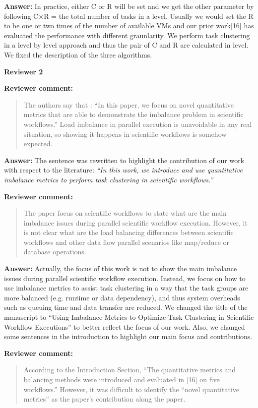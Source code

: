 \documentclass{letter}
\newenvironment{review}%
{\textbf{Reviewer comment:}\begin{quote}}%
{\end{quote}}%
\newcommand{\answer}[1]{%
      \textbf{Answer:} #1}
\newcommand{\revised}[1]{\emph{#1}\color{black}}
\begin{document}
\begin{letter}{}
\answer{In practice, either C or R will be set and we get the other parameter by following C$\times$R = the total number of tasks in a level. Usually we would set the R to be one or two times of the number of available VMs and our prior work[16] has evaluated the performance with different graunlarity. We perform task clustering in a level by level approach and thus the pair of C and R are calculated in level. We fixed the description of the three algorithms. }


\newpage

\textbf{Reviewer 2}


\begin{review}
The authors say that : ``In this paper, we focus on novel quantitative metrics that are able to demonstrate the imbalance problem in scientific workflows.'' Load imbalance in parallel execution is unavoidable in any real situation, so showing it happens in scientific workflows is somehow expected.
\end{review}

\answer{The sentence was rewritten to highlight the contribution of our work with respect to the literature:
\revised{``In this work, we introduce and use quantitative imbalance metrics to perform task clustering in scientific workflows.''}}


\begin{review}
The paper focus on scientific workflows to state what are the main imbalance issues during parallel scientific workflow execution. However, it is not clear what are the load balancing differences between scientific workflows and other data flow parallel scenarios like map/reduce or database operations.
\end{review}

\answer{Actually, the focus of this work is not to show the main imbalance issues during parallel scientific workflow execution. Instead, we focus on how to use imbalance metrics to assist task clustering in a way that the task groups are more balanced (e.g. runtime or data dependency), and thus system overheads such as queuing time and data transfer are reduced. We changed the title of the manuscript to ``Using Imbalance Metrics to Optimize Task Clustering in Scientific Workflow Executions'' to better reflect the focus of our work. Also, we changed some sentences in the introduction to highlight our main focus and contributions.}


\begin{review}
According to the Introduction Section, ``The quantitative metrics and balancing methods were introduced and evaluated in [16] on five workflows.'' However, it was difficult to identify the ``novel quantitative metrics'' as the paper's contribution along the paper. 
\end{review}


\end{letter}
\end{document}
